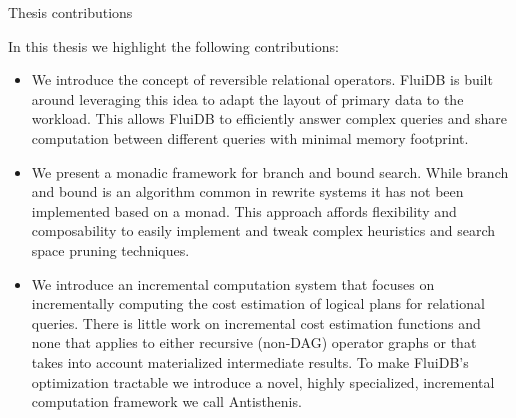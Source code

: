 \begin{corrected}{Thesis contributions}

In this thesis we highlight the following contributions:

\begin{itemize}
\item We introduce the concept of reversible relational operators. FluiDB
  is built around leveraging this idea to adapt the layout of
  primary data to the workload. This allows FluiDB to efficiently
  answer complex queries and share computation between different
  queries with minimal memory footprint.
\item We present a monadic framework for branch and bound search. While
  branch and bound is an algorithm common in rewrite systems it has
  not been implemented based on a monad. This approach affords
  flexibility and composability to easily implement and tweak complex
  heuristics and search space pruning techniques.
\item We introduce an incremental computation system that focuses on
  incrementally computing the cost estimation of logical plans for
  relational queries. There is little work on incremental cost
  estimation functions and none that applies to either recursive
  (non-DAG) operator graphs or that takes into account materialized
  intermediate results. To make FluiDB's optimization tractable we
  introduce a novel, highly specialized, incremental computation
  framework we call Antisthenis.
\end{itemize}

  \begin{comment}
\begin{itemize}
\item We provide an overview of the literature regarding intermediate
  result recycling.
\item We describe a framework and a case study for a novel approach of
  unifying query planning and intermediate result management.
\item We introduce reversible relational operators and how they can be
  used to create effective plans in memory constrained environments,
  effectively unifying the query planning and intermediate result
  recycling mechanisms.
\item We introduce a novel variant of a branch and bound algorithm
  used for planning relational queries.
\item We introduce Antisthenis, a novel approach to incremental
  computation used for the needs of query planning that aggressively
  takes advantage of the particular properties of the computations
  involved in plan cost estimation and relation materialisability.
\item We describe a code generation framework to support the operation
  of FluiDB.
\item We provide experimental evaluation of how all these parts fit
  together to compose FluiDB, particularly in the context of a star
  schema based benchmark.
\end{itemize}
\end{comment}
\end{corrected}

